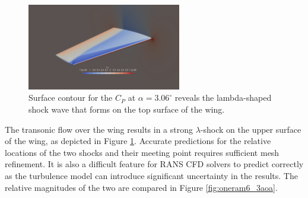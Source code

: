 \begin{figure}
\center
\includegraphics[width=0.6\textwidth]{code/image_gen/oneram6/images/oneram6_cp_contour.png}
\caption{Surface contour for the $C_P$ at $\alpha= 3.06^\circ$ reveals the lambda-shaped shock wave that forms on the top surface of the wing. \label{fig:oneram6_cp}}
\end{figure}

The transonic flow over the wing results in a strong $\lambda$-shock on the upper surface of the wing, as depicted in Figure \ref{fig:oneram6_cp}.
Accurate predictions for the relative locations of the two shocks and their meeting point requires sufficient mesh refinement. 
It is also a difficult feature for RANS CFD solvers to predict correctly as the turbulence model can introduce significant uncertainty in the results.
The relative magnitudes of the two are compared in Figure \ref{fig:oneram6_3aoa}.


